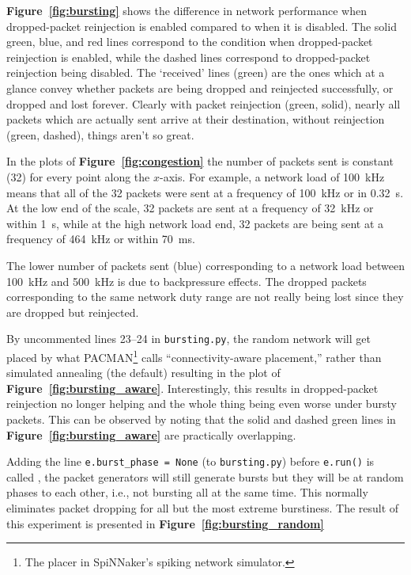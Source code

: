 \documentclass[a4paper, 11pt]{article}
\newlength\drop
\begin{document}
\textbf{Figure~\ref{fig:bursting}} shows the difference in network performance when dropped-packet reinjection is enabled compared to when it is disabled. The solid green, blue, and red lines correspond to the condition when dropped-packet reinjection is enabled, while the dashed lines correspond to dropped-packet reinjection being disabled. The `received' lines (green) are the ones which at a glance convey whether packets are being dropped and reinjected successfully, or dropped and lost forever. Clearly with packet reinjection (green, solid), nearly all packets which are actually sent arrive at their destination, without reinjection (green, dashed), things aren't so great. 

In the plots of \textbf{Figure~\ref{fig:congestion}} the number of packets sent is constant (32) for every point along the $x$-axis. For example, a network load of 100~kHz means that all of the 32 packets were sent at a frequency of 100~kHz or in 0.32~s. At the low end of the scale, 32 packets are sent at a frequency of 32~kHz or within 1~s, while at the high network load end, 32 packets are being sent at a frequency of 464~kHz or within 70~ms.

The lower number of packets sent (blue) corresponding to a network load between 100~kHz and 500~kHz is due to backpressure effects. The dropped packets corresponding to the same network duty range are not really being lost since they are dropped but reinjected.

By uncommented lines 23--24 in \verb|bursting.py|, the random network will get placed by what PACMAN\footnote{The placer in SpiNNaker's spiking network simulator.} calls ``connectivity-aware placement,'' rather than simulated annealing (the default) resulting in the plot of \textbf{Figure~\ref{fig:bursting_aware}}. Interestingly, this results in dropped-packet reinjection no longer helping and the whole thing being even worse under bursty packets. This can be observed by noting that the solid and dashed green lines in \textbf{Figure~\ref{fig:bursting_aware}} are practically overlapping.

Adding the line \verb|e.burst_phase = None| (to \verb|bursting.py|) before \verb|e.run()| is called , the packet generators will still generate bursts but they will be at random phases to each other, i.e., not bursting all at the same time. This normally eliminates packet dropping for all but the most extreme burstiness. The result of this experiment is presented in \textbf{Figure~\ref{fig:bursting_random}}
\end{document}
